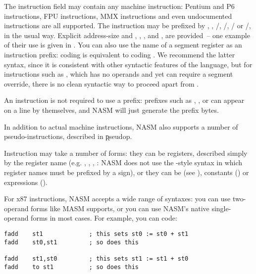 The instruction field may contain any machine instruction: Pentium
and P6 instructions, FPU instructions, MMX instructions and even
undocumented instructions are all supported. The instruction may be
prefixed by , , /,
/, / or
/, in the usual way. Explicit
address-size and 
, , , 
and ,  are provided~-- one example of their
use is given in . You can also use the name of a
segment register as an instruction prefix: coding
 is equivalent to coding .
We recommend the latter syntax, since it is consistent with other syntactic
features of the language, but for instructions such as , which
has no operands and yet can require a segment override, there is no clean
syntactic way to proceed apart from .

An instruction is not required to use a prefix: prefixes such as
, ,  or  can appear on
a line by themselves, and NASM will just generate the prefix bytes.

In addition to actual machine instructions, NASM also supports a
number of pseudo-instructions, described in \k{pseudop}.

Instruction  may take a number of forms: they can be
registers, described simply by the register name (e.g. ,
, , : NASM does not use the -style
syntax in which register names must be prefixed by a \code{\%} sign),
or they can be  (see ),
constants () or expressions ().

For x87  instructions, NASM accepts a wide
range of syntaxes: you can use two-operand forms like MASM supports,
or you can use NASM's native single-operand forms in most cases.
For example, you can code:

\begin{lstlisting}
fadd    st1             ; this sets st0 := st0 + st1
fadd    st0,st1         ; so does this

fadd    st1,st0         ; this sets st1 := st1 + st0
fadd    to st1          ; so does this
\end{lstlisting}

